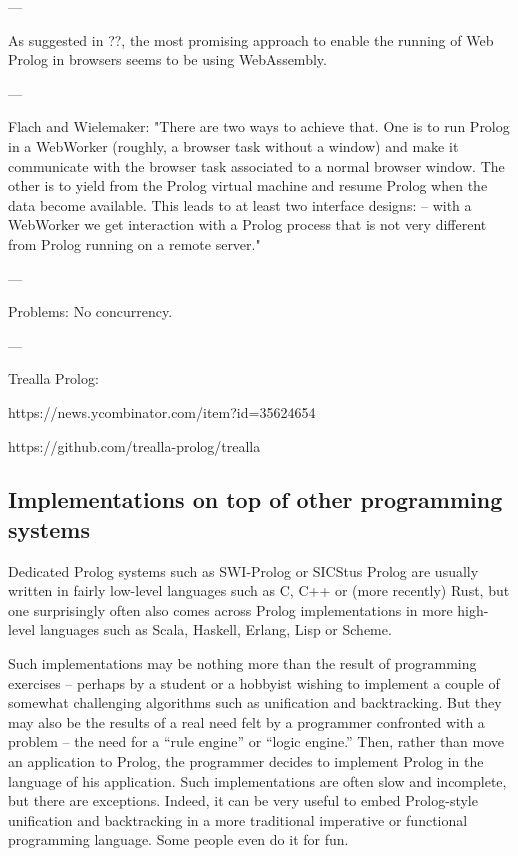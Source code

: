 ---

As suggested in ??, the most promising approach to enable the running of Web Prolog in browsers seems to be using WebAssembly.

---

Flach and Wielemaker: "There are two ways to achieve that. One is to run  Prolog in a WebWorker (roughly, a browser task without a window) and make  it communicate with the browser task associated to a normal browser window.  The other is to yield from the Prolog virtual machine and resume Prolog when  the data become available. This leads to at least two interface designs: -- with a WebWorker we get interaction with a Prolog process that is not very  different from Prolog running on a remote server."

---

Problems: No concurrency.

---

Trealla Prolog:

https://news.ycombinator.com/item?id=35624654

https://github.com/trealla-prolog/trealla


\subsection{Implementations on top of other programming systems}\label{sec:implementation-on-top-of-other}

Dedicated Prolog systems such as SWI-Prolog or SICStus Prolog are usually written in fairly low-level languages such as C, C++ or (more recently) Rust, but one surprisingly often also comes across Prolog implementations in more high-level languages such as Scala, Haskell, Erlang, Lisp or Scheme.

Such implementations may be nothing more than the result of programming exercises -- perhaps by a student or a hobbyist wishing to implement a couple of somewhat challenging algorithms such as unification and backtracking. But they may also be the results of a real need felt by a programmer confronted with a problem -- the need for a ``rule engine'' or ``logic engine.''  Then, rather than move an application to Prolog, the programmer decides to implement Prolog in the language of his application. Such implementations are often slow and incomplete, but there are exceptions. Indeed, it can be very useful to embed Prolog-style unification and backtracking in a more traditional imperative or functional programming language. Some people even do it for fun.

